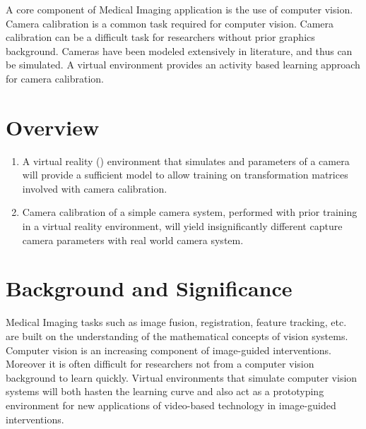 \documentclass[11pt]{report}
\begin{document}
A core component of Medical Imaging application is the use of computer vision. Camera calibration is a common task required for computer vision. Camera calibration can be a difficult task for researchers without prior graphics background. Cameras have been modeled extensively in literature, and thus can be simulated. A virtual environment provides an activity based learning approach for camera calibration. 
     
\section{Overview}


  
\begin{enumerate}
\item A virtual reality () environment that simulates  and  parameters of a camera will provide a sufficient model to allow training on transformation matrices involved with camera calibration.
\item Camera calibration of a simple camera system, performed with prior training in a virtual reality environment, will yield insignificantly different capture camera parameters with real world camera system. 
\end{enumerate}

\section{Background and Significance}

Medical Imaging tasks such as image fusion, registration, feature tracking, etc. are built on the understanding of the mathematical concepts of vision systems. Computer vision is an increasing component of image-guided interventions. Moreover it is often difficult for researchers not from a computer vision background to learn quickly. Virtual environments that simulate computer vision systems will both hasten the learning curve and also act as a prototyping environment for new applications of video-based technology in image-guided interventions. 
\end{document}
